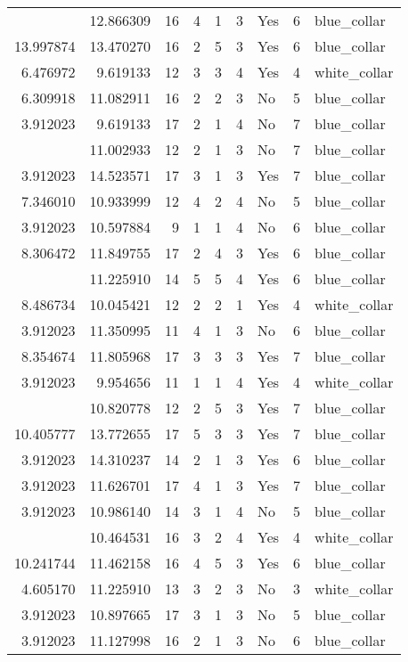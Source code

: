 \documentclass[
]{article}
\begin{document}
\begin{longtable}[t]{rrrrrllrl}
\addlinespace
3.912023 & 12.866309 & 16 & 4 & 1 & 3 & Yes & 6 & blue\_collar\\
13.997874 & 13.470270 & 16 & 2 & 5 & 3 & Yes & 6 & blue\_collar\\
6.476972 & 9.619133 & 12 & 3 & 3 & 4 & Yes & 4 & white\_collar\\
6.309918 & 11.082911 & 16 & 2 & 2 & 3 & No & 5 & blue\_collar\\
3.912023 & 9.619133 & 17 & 2 & 1 & 4 & No & 7 & blue\_collar\\
\addlinespace
3.912023 & 11.002933 & 12 & 2 & 1 & 3 & No & 7 & blue\_collar\\
3.912023 & 14.523571 & 17 & 3 & 1 & 3 & Yes & 7 & blue\_collar\\
7.346010 & 10.933999 & 12 & 4 & 2 & 4 & No & 5 & blue\_collar\\
3.912023 & 10.597884 & 9 & 1 & 1 & 4 & No & 6 & blue\_collar\\
8.306472 & 11.849755 & 17 & 2 & 4 & 3 & Yes & 6 & blue\_collar\\
\addlinespace
8.022897 & 11.225910 & 14 & 5 & 5 & 4 & Yes & 6 & blue\_collar\\
8.486734 & 10.045421 & 12 & 2 & 2 & 1 & Yes & 4 & white\_collar\\
3.912023 & 11.350995 & 11 & 4 & 1 & 3 & No & 6 & blue\_collar\\
8.354674 & 11.805968 & 17 & 3 & 3 & 3 & Yes & 7 & blue\_collar\\
3.912023 & 9.954656 & 11 & 1 & 1 & 4 & Yes & 4 & white\_collar\\
\addlinespace
10.820778 & 10.820778 & 12 & 2 & 5 & 3 & Yes & 7 & blue\_collar\\
10.405777 & 13.772655 & 17 & 5 & 3 & 3 & Yes & 7 & blue\_collar\\
3.912023 & 14.310237 & 14 & 2 & 1 & 3 & Yes & 6 & blue\_collar\\
3.912023 & 11.626701 & 17 & 4 & 1 & 3 & Yes & 7 & blue\_collar\\
3.912023 & 10.986140 & 14 & 3 & 1 & 4 & No & 5 & blue\_collar\\
\addlinespace
5.521461 & 10.464531 & 16 & 3 & 2 & 4 & Yes & 4 & white\_collar\\
10.241744 & 11.462158 & 16 & 4 & 5 & 3 & Yes & 6 & blue\_collar\\
4.605170 & 11.225910 & 13 & 3 & 2 & 3 & No & 3 & white\_collar\\
3.912023 & 10.897665 & 17 & 3 & 1 & 3 & No & 5 & blue\_collar\\
3.912023 & 11.127998 & 16 & 2 & 1 & 3 & No & 6 & blue\_collar\\

\end{longtable}
\end{document}
